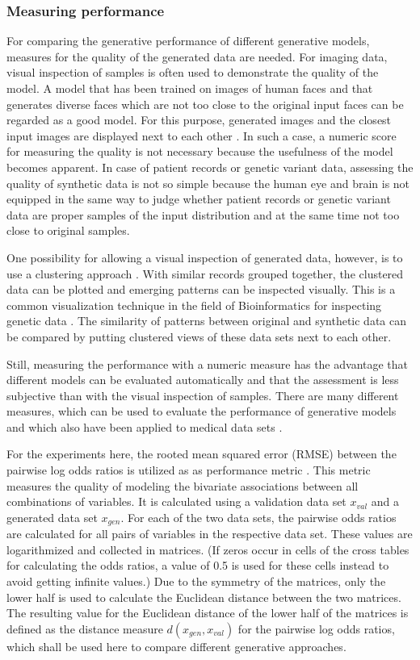 \documentclass[12pt]{article}
\begin{document}
\subsubsection{Measuring performance}\label{measuringperformance}
For comparing the generative performance of different generative models, measures for the quality of the generated data are needed.
For imaging data, visual inspection of samples is often used  to demonstrate the quality of the model.
A model that has been trained on images of human faces and that generates diverse faces which are not too close to the original input faces can be regarded as a good model.
For this purpose, generated images and the closest input images are displayed next to each other \citep{theis_note_2015}.
In such a case, a numeric score for measuring the quality is not necessary because the usefulness of the model becomes apparent.
In case of patient records or genetic variant data, assessing the quality of synthetic data is not so simple because the human eye and brain is not equipped in the same way to judge whether patient records or genetic variant data are proper samples of the input distribution and at the same time not too close to original samples.

One possibility for allowing a visual inspection of generated data, however, is to use a clustering approach \citep{hclust}.
With similar records grouped together, the clustered data can be plotted and emerging patterns can be inspected visually.
This is a common visualization technique in the field of Bioinformatics for inspecting genetic data \citep{eisen_cluster_1998}.
The similarity of patterns between original and synthetic data can be compared by putting clustered views of these data sets next to each other.

Still, measuring the performance with a numeric measure has the advantage that different models can be evaluated automatically and that the assessment is less subjective than with the visual inspection of samples.
There are many different measures, which can be used to evaluate the performance of generative models and which also have been applied to medical data sets \citep{goncalves}.

For the experiments here, the rooted mean squared error (RMSE) between the pairwise log odds ratios is utilized as as performance metric \citep{nussberger_synthetic_2020}.
This metric measures the quality of modeling the bivariate associations between all combinations of variables.
It is calculated using a validation data set $x_{val}$ and a generated data set $x_{gen}$.
For each of the two data sets, the pairwise odds ratios are calculated for all pairs of variables in the respective data set.
These values are logarithmized and collected in matrices.
(If zeros occur in cells of the cross tables for calculating the odds ratios, a value of 0.5 is used for these cells instead to avoid getting infinite values.)
Due to the symmetry of the matrices, only the lower half is used to calculate the Euclidean distance between the two matrices.
The resulting value for the Euclidean distance of the lower half of the matrices is defined as the distance measure $d(x_{gen}, x_{val})$ for the pairwise log odds ratios, which shall be used here to compare different generative approaches.
\end{document}
